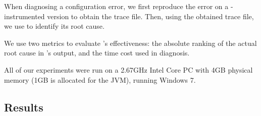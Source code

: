 When diagnosing a configuration error, we first reproduce the
error on a \ourtool-instrumented version to obtain the
trace file. Then, using the obtained trace file, we use \ourtool
to identify its root cause.

We use two metrics to evaluate \ourtool's effectiveness:
the absolute ranking of the actual root cause in \ourtool's output,
and the time cost used in diagnosis.


All of our experiments were run on a
2.67GHz Intel Core PC with 4GB physical memory (1GB is allocated
for the JVM), running Windows 7.


\subsection{Results}
\label{sec:results}

